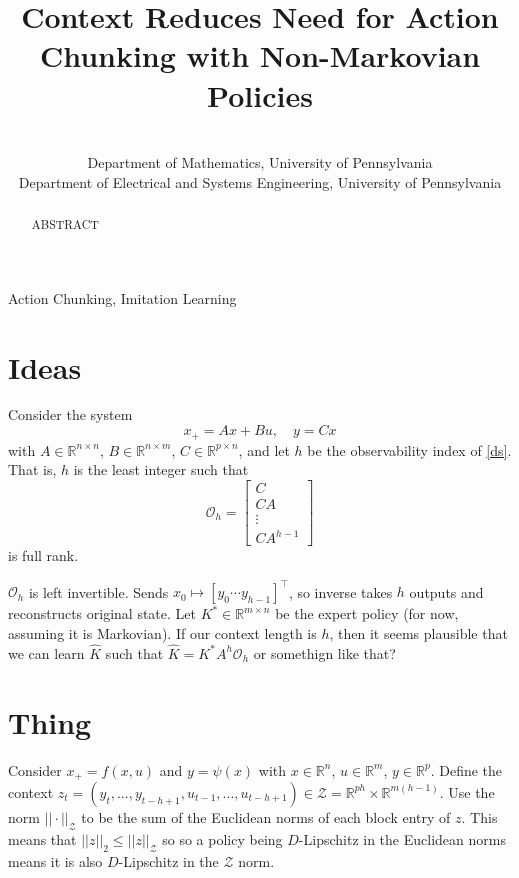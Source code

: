 \documentclass[final]{l4dc2026}
\title[Short Title]{Context Reduces Need for Action Chunking with Non-Markovian Policies}
\author{%
 \Name{Nihar Ballamudi} \Email{niharb@sas.upenn.edu}\\
 \addr Department of Mathematics, University of Pennsylvania
 \AND
 \Name{Kyle Horton} \Email{kyhorton@engineering.upenn.edu}\\
 \addr Department of Electrical and Systems Engineering, University of Pennsylvania%
}
\newcommand{\cd}{\cdot}
\newcommand{\R}{\mathbb{R}}
\newcommand{\bmx}[1]{\begin{bmatrix} #1 \end{bmatrix}}
\newcommand{\obsv}{\mathcal{O}}
\begin{document}
\maketitle

\begin{abstract}%
ABSTRACT
\end{abstract}

\begin{keywords}%
  Action Chunking, Imitation Learning
\end{keywords}

\section{Ideas}
Consider the system \begin{equation}\tag*{$(*)$}x_+ = Ax + Bu,\quad y = Cx\label{ds}\end{equation} with $A \in \R^{n\times n}$, $B \in \R^{n \times m}$, $C \in \R^{p \times n}$, and let $h$ be the observability index of \ref{ds}. That is, $h$ is the least integer such that \[\mathcal{O}_h = \bmx{C\\ CA\\ \vdots\\ CA^{h-1}}\] is full rank.


$\mathcal{O}_h$ is left invertible. Sends $x_0 \mapsto [y_0 \cdots y_{h-1}]^\top$, so inverse takes $h$ outputs and reconstructs original state. 
Let $K^* \in \R^{m \times n}$ be the expert policy (for now, assuming it is Markovian). 
If our context length is $h$, then it seems plausible that we can learn $\hat K$ such that $\hat K = K^*A^h\obsv_h$ or somethign like that?



\section{Thing}
Consider $x_+ = f(x, u)$ and $y = \psi(x)$ with $x \in \R^n$, $u \in \R^m$, $y \in \R^p$. Define the context $z_t = (y_t, ..., y_{t - h+1}, u_{t-1}, ..., u_{t - h + 1}) \in \mathcal{Z} = \R^{ph} \times \R^{m(h-1)}$. Use the norm $||\cd||_\mathcal{Z}$ to be the sum of the Euclidean norms of each block entry of $z$. This means that $||z||_2 \le ||z||_\mathcal{Z}$ so so a policy being $D$-Lipschitz in the Euclidean norms means it is also $D$-Lipschitz in the $\mathcal{Z}$ norm. 
\end{document}
